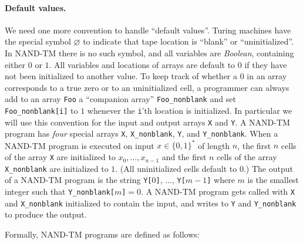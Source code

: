 \paragraph{Default values.} We need one more convention to handle
``default values''. Turing machines have the special symbol
\(\varnothing\) to indicate that tape location is ``blank'' or
``uninitialized''. In NAND-TM there is no such symbol, and all variables
are \emph{Boolean}, containing either \(0\) or \(1\). All variables and
locations of arrays are default to \(0\) if they have not been
initialized to another value. To keep track of whether a \(0\) in an
array corresponds to a true zero or to an uninitialized cell, a
programmer can always add to an array \texttt{Foo} a ``companion array''
\texttt{Foo\_nonblank} and set \texttt{Foo\_nonblank[i]} to \(1\)
whenever the \texttt{i}'th location is initialized. In particular we
will use this convention for the input and output arrays \texttt{X} and
\texttt{Y}. A NAND-TM program has \emph{four} special arrays \texttt{X},
\texttt{X\_nonblank}, \texttt{Y}, and \texttt{Y\_nonblank}. When a
NAND-TM program is executed on input \(x\in \{0,1\}^*\) of length \(n\),
the first \(n\) cells of the array \texttt{X} are initialized to
\(x_0,\ldots,x_{n-1}\) and the first \(n\) cells of the array
\texttt{X\_nonblank} are initialized to \(1\). (All uninitialized cells
default to \(0\).) The output of a NAND-TM program is the string
\texttt{Y[}\(0\)\texttt{]}, \(\ldots\), \texttt{Y[}\(m-1\)\texttt{]}
where \(m\) is the smallest integer such that
\texttt{Y\_nonblank[}\(m\)\texttt{]}\(=0\). A NAND-TM program gets
called with \texttt{X} and \texttt{X\_nonblank} initialized to contain
the input, and writes to \texttt{Y} and \texttt{Y\_nonblank} to produce
the output.

Formally, NAND-TM programs are defined as follows:

